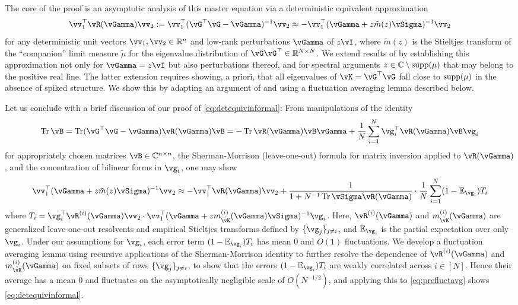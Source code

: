 The core of the proof is an asymptotic analysis of this master equation
via a deterministic equivalent approximation
\begin{equation}\label{eq:detequivinformal}
\vv_1^\top \vR(\vGamma)\vv_2:=
\vv_1^\top (\vG^\top \vG-\vGamma)^{-1}\vv_2 \approx {-}\vv_1^\top
(\vGamma+z\tilde m(z)\vSigma)^{-1}\vv_2
\end{equation}
for any deterministic unit vectors $\vv_1,\vv_2 \in \R^n$ and low-rank perturbations $\vGamma$
of $z\vI$, where $\tilde m(z)$ is the
Stieltjes transform of the ``companion'' limit measure $\tilde \mu$ for the
eigenvalue distribution of $\vG\vG^\top \in \R^{N \times N}$. We extend
results of \cite{chouard2022quantitative,schroder2023deterministic}
by establishing this approximation not only for $\vGamma=z\vI$ but also
perturbations thereof, and for spectral arguments $z \in \mathbb{C} \setminus
\mathrm{supp}({\mu})$ that may belong to the positive real line. The latter
extension requires showing, a priori, that all eigenvalues of
$\vK=\vG^\top \vG$ fall close to $\mathrm{supp}({\mu})$ in the absence of spiked structure.
We show this by adapting an argument of \cite{bai1998no} and using a fluctuation
averaging lemma described below.

Let us conclude with a brief discussion of our proof
of \eqref{eq:detequivinformal}: From manipulations of the identity
	\[\Tr \vB=
\Tr (\vG^\top \vG-\vGamma)\vR(\vGamma)\vB={-}\Tr
\vR(\vGamma)\vB\vGamma+\frac{1}{N}\sum_{i=1}^N \vg_i^\top \vR(\vGamma)\vB\vg_i\]
for appropriately chosen matrices $\vB \in \C^{n \times n}$,
the Sherman-Morrison (leave-one-out) formula for matrix
inversion applied to $\vR(\vGamma)$, and the concentration of bilinear
forms in $\vg_i$, one may show
\begin{equation}\label{eq:prefluctavg}
\vv_1^\top (\vGamma+z\tilde m(z)\vSigma)^{-1}\vv_2
\approx {-}\vv_1^\top \vR(\vGamma)\vv_2+
			 \frac{1}{1+N^{-1}\Tr \vSigma\vR(\vGamma)}
			 \cdot \frac{1}{N}\sum_{i=1}^N (1-\E_{\vg_i})T_i
\end{equation}
where $T_i=\vg_i^\top
	\vR^{(i)}(\vGamma)\vv_2 \cdot \vv_1^\top(\vGamma+z m_{\tilde
\vK}^{(i)}(\vGamma)\vSigma)^{-1} \vg_i$. Here, $\vR^{(i)}(\vGamma)$ and
$m_{\tilde \vK}^{(i)}(\vGamma)$ are generalized leave-one-out resolvents and
empirical Stieltjes transforms defined by $\{\vg_j\}_{j \neq i}$, and $\E_{\vg_i}$
is the partial expectation over only $\vg_i$. Under our assumptions for $\vg_i$,
each error term $(1-\E_{\vg_i})T_i$ has mean 0 and $O(1)$ fluctuations.
We develop a fluctuation averaging lemma using recursive applications of the
Sherman-Morrison identity to further resolve the dependence of
$\vR^{(i)}(\vGamma)$ and $m_{\tilde \vK}^{(i)}(\vGamma)$ on fixed subsets of
rows $\{\vg_j\}_{j \neq i}$, to show that the errors
$(1-\E_{\vg_i})T_i$ are weakly correlated across $i \in [N]$. Hence their
average has a mean 0 and fluctuates on the asymptotically negligible
scale of $O(N^{-1/2})$, and applying this to \eqref{eq:prefluctavg} shows
\eqref{eq:detequivinformal}.


\bigskip


